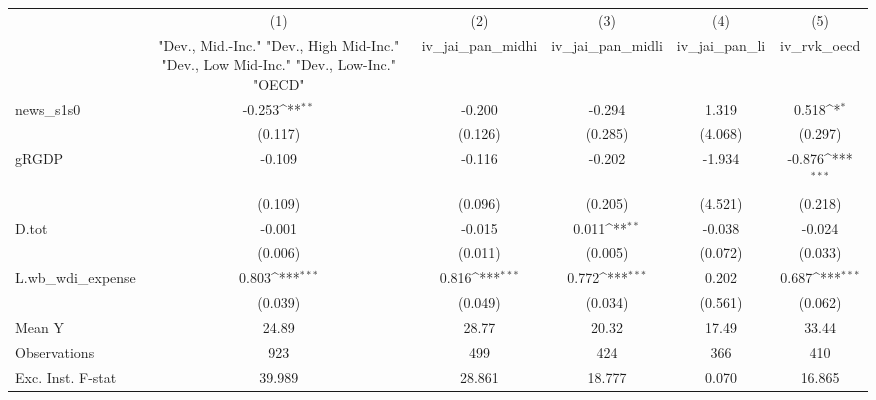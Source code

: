 {
\def\sym#1{\ifmmode^{#1}\else\(^{#1}\)\fi}
\begin{tabular}{l*{5}{c}}
\toprule
            &\multicolumn{1}{c}{(1)}&\multicolumn{1}{c}{(2)}&\multicolumn{1}{c}{(3)}&\multicolumn{1}{c}{(4)}&\multicolumn{1}{c}{(5)}\\
            &\multicolumn{1}{c}{ "Dev., Mid.-Inc." "Dev., High Mid-Inc." "Dev., Low Mid-Inc." "Dev., Low-Inc." "OECD" }&\multicolumn{1}{c}{iv\_jai\_pan\_midhi}&\multicolumn{1}{c}{iv\_jai\_pan\_midli}&\multicolumn{1}{c}{iv\_jai\_pan\_li}&\multicolumn{1}{c}{iv\_rvk\_oecd}\\
\midrule
news\_s1s0   &      -0.253\sym{**} &      -0.200         &      -0.294         &       1.319         &       0.518\sym{*}  \\
            &     (0.117)         &     (0.126)         &     (0.285)         &     (4.068)         &     (0.297)         \\
\addlinespace
gRGDP       &      -0.109         &      -0.116         &      -0.202         &      -1.934         &      -0.876\sym{***}\\
            &     (0.109)         &     (0.096)         &     (0.205)         &     (4.521)         &     (0.218)         \\
\addlinespace
D.tot       &      -0.001         &      -0.015         &       0.011\sym{**} &      -0.038         &      -0.024         \\
            &     (0.006)         &     (0.011)         &     (0.005)         &     (0.072)         &     (0.033)         \\
\addlinespace
L.wb\_wdi\_expense&       0.803\sym{***}&       0.816\sym{***}&       0.772\sym{***}&       0.202         &       0.687\sym{***}\\
            &     (0.039)         &     (0.049)         &     (0.034)         &     (0.561)         &     (0.062)         \\
\midrule
Mean Y      &       24.89         &       28.77         &       20.32         &       17.49         &       33.44         \\
Observations&         923         &         499         &         424         &         366         &         410         \\
Exc. Inst. F-stat&      39.989         &      28.861         &      18.777         &       0.070         &      16.865         \\
\bottomrule
\end{tabular}
}

